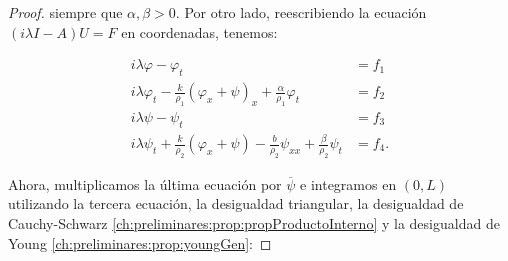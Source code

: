 \begin{proof}
    siempre que $\alpha, \beta > 0$. Por otro lado, reescribiendo la ecuación $(i\lambda I - A)U = F$ en coordenadas, tenemos:

    \begin{align*}
        i\lambda \varphi - \varphi_t &= f_1\\
        i\lambda\varphi_t - \frac{k}{\rho_1}(\varphi_{x} + \psi)_x + \frac{\alpha}{\rho_1}\varphi_t &= f_2\\
        i\lambda \psi - \psi_t &= f_3\\
        i\lambda\psi_t + \frac{k}{\rho_2}(\varphi_x + \psi) - \frac{b}{\rho_2}\psi_{xx} + \frac{\beta}{\rho_2}\psi_t &= f_4.
    \end{align*}

    Ahora, multiplicamos la última ecuación por $\overline{\psi}$ e integramos en $(0,L)$ utilizando la tercera ecuación, la desigualdad triangular, la desigualdad de Cauchy-Schwarz \ref{ch:preliminares:prop:propProductoInterno} y la desigualdad de Young \ref{ch:preliminares:prop:youngGen}:


\end{proof}
